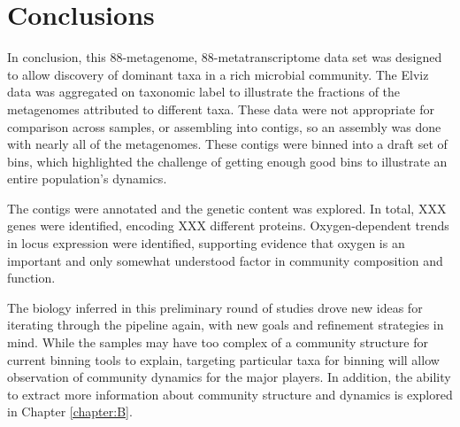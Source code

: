 \section{Conclusions}

In conclusion, this 88-metagenome, 88-metatranscriptome data set was designed to allow discovery of dominant taxa in a rich microbial community.
The Elviz data was aggregated on taxonomic label to illustrate the fractions of the metagenomes attributed to different taxa.
These data were not appropriate for comparison across samples, or assembling into contigs, so an assembly was done with nearly all of the metagenomes.
These contigs were binned into a draft set of bins, which highlighted the challenge of getting enough good bins to illustrate an entire population's dynamics.

The contigs were annotated and the genetic content was explored.
In total, XXX genes were identified, encoding XXX different proteins.
Oxygen-dependent trends in locus expression were identified, supporting evidence that oxygen is an important and only somewhat understood factor in community composition and function.

The biology inferred in this preliminary round of studies drove new ideas for iterating through the pipeline again, with new goals and refinement strategies in mind.
While the samples may have too complex of a community structure for current binning tools to explain, targeting particular taxa for binning will allow observation of community dynamics for the major players.
In addition, the ability to extract more information about community structure and dynamics is explored in Chapter \ref{chapter:B}.


